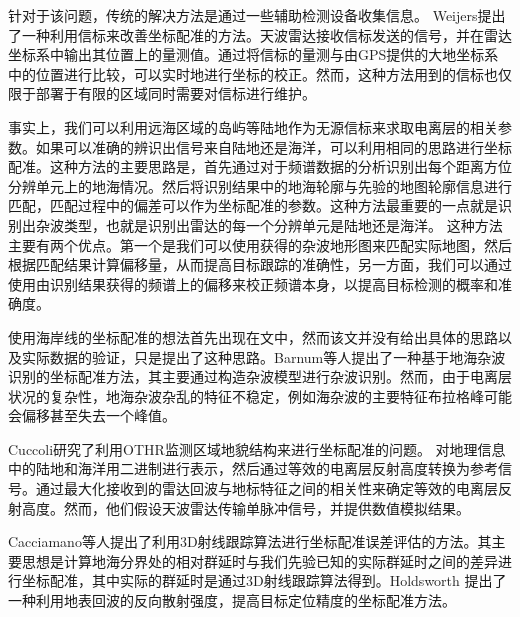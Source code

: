 针对于该问题，传统的解决方法是通过一些辅助检测设备收集信息。
Weijers\cite{weijers1995oth}提出了一种利用信标来改善坐标配准的方法。天波雷达接收信标发送的信号，并在雷达坐标系中输出其位置上的量测值。通过将信标的量测与由GPS提供的大地坐标系中的位置进行比较，可以实时地进行坐标的校正。然而，这种方法用到的信标也仅限于部署于有限的区域同时需要对信标进行维护。

事实上，我们可以利用远海区域的岛屿等陆地作为无源信标来求取电离层的相关参数。如果可以准确的辨识出信号来自陆地还是海洋，可以利用相同的思路进行坐标配准。这种方法的主要思路是，首先通过对于频谱数据的分析识别出每个距离方位分辨单元上的地海情况。然后将识别结果中的地海轮廓与先验的地图轮廓信息进行匹配，匹配过程中的偏差可以作为坐标配准的参数。这种方法最重要的一点就是识别出杂波类型，也就是识别出雷达的每一个分辨单元是陆地还是海洋。
这种方法主要有两个优点。第一个是我们可以使用获得的杂波地形图来匹配实际地图，然后根据匹配结果计算偏移量，从而提高目标跟踪的准确性，另一方面，我们可以通过使用由识别结果获得的频谱上的偏移来校正频谱本身，以提高目标检测的概率和准确度。

使用海岸线的坐标配准的想法首先出现在文\cite{wheadon1994ionospheric, anderson1995auto}中，然而该文并没有给出具体的思路以及实际数据的验证，只是提出了这种思路。Barnum等人\cite{barnum1998over}提出了一种基于地海杂波识别的坐标配准方法，其主要通过构造杂波模型进行杂波识别。然而，由于电离层状况的复杂性，地海杂波杂乱的特征不稳定，例如海杂波的主要特征布拉格峰可能会偏移甚至失去一个峰值。

Cuccoli\cite{cuccoli2009over, cuccoli2009over2, cuccoli2010sea, cuccoli2011coordinate}研究了利用OTHR监测区域地貌结构来进行坐标配准的问题。
对地理信息中的陆地和海洋用二进制进行表示，然后通过等效的电离层反射高度转换为参考信号。通过最大化接收到的雷达回波与地标特征之间的相关性来确定等效的电离层反射高度。然而，他们假设天波雷达传输单脉冲信号，并提供数值模拟结果。

Cacciamano\cite{cacciamano2012coordinate}等人提出了利用3D射线跟踪算法进行坐标配准误差评估的方法。其主要思想是计算地海分界处的相对群延时与我们先验已知的实际群延时之间的差异进行坐标配准，其中实际的群延时是通过3D射线跟踪算法得到。Holdsworth \cite{holdsworth2017skywave} 提出了一种利用地表回波的反向散射强度，提高目标定位精度的坐标配准方法。

